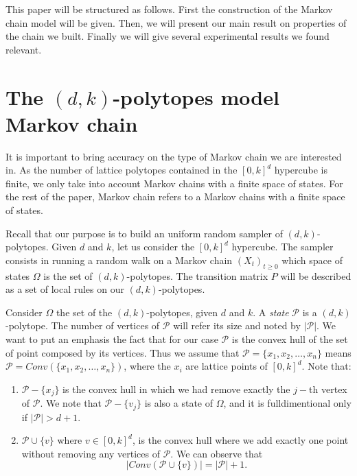 \documentclass[a4paper]{article}
\newcommand{\p}{\mathcal{P}}
\begin{document}
This paper will be structured as follows. First the construction of the Markov chain model will be given. Then, we will present our main result on properties of the chain we built. Finally we will give several experimental results we found relevant.

\section{The $(d,k)$-polytopes model Markov chain}

It is important to bring accuracy on the type of Markov chain we are interested in. As the number of lattice polytopes contained in the $[0,k]^d$ hypercube is finite, we only take into account Markov chains with a finite space of states. For the rest of the paper, Markov chain refers to a Markov chains with a finite space of states.

Recall that our purpose is to build an uniform random sampler of $(d,k)$-polytopes. Given $d$ and $k$, let us consider the $[0,k]^d$ hypercube. The sampler consists in running a random walk on a Markov chain $(X_t)_{t\geq{0}}$ which space of states $\Omega$ is the set of $(d,k)$-polytopes. The transition matrix $P$ will be described as a set of local rules on our $(d,k)$-polytopes.


Consider $\Omega$ the set of the $(d,k)$-polytopes, given $d$ and $k$. A \textit{state} $\p$ is a $(d,k)$-polytope. The number of vertices of $\p$ will refer its size and noted by $|\p|$. We want to put an emphasis the fact that for our case $\p$ is the convex hull of the set of point composed by its vertices. Thus we assume that $\p=\{x_1, x_2, …, x_n\}$
means $\p=Conv(\{x_1, x_2, …, x_n\})$, where the $x_i$ are lattice points of $[0,k]^d$. Note that:

\begin{enumerate}
  \item $\p-\{x_j\}$ is the convex hull in which we had remove exactly the $j-$th vertex of $\p$. We note that $\p-\{v_j\}$ is also a state of $\Omega$, and it is fulldimentional only if $|\p|>d+1$.
  \item $\p \cup \{v\}$ where $v \in [0,k]^d$, is the convex hull where we add exactly one point without removing any vertices of $\p$. We can observe that
  $$
    |Conv(\p \cup \{v\})| = |\p| + 1 \mbox{.}
  $$
\end{enumerate}
\end{document}
